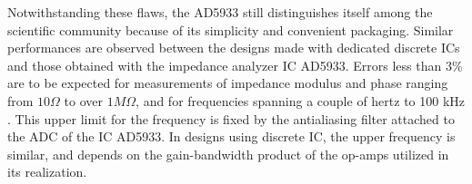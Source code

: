 Notwithstanding these flaws, the AD5933 still distinguishes itself among the scientific community because of its simplicity and convenient packaging. Similar performances are observed between the designs made with dedicated discrete ICs and those obtained with the impedance analyzer IC AD5933. Errors less than $3\%$ are to be expected for measurements of impedance modulus and phase ranging from $10 \Omega$ to over $1 M\Omega$, and for frequencies spanning a couple of hertz to 100 kHz \cite{Al-Ali2017,Sylvain2018,Chabowski2015}. This upper limit for the frequency is fixed by the antialiasing filter attached to the ADC of the IC AD5933. In designs using discrete IC, the upper frequency is similar, and depends on the gain-bandwidth product of the op-amps utilized in its realization. 
